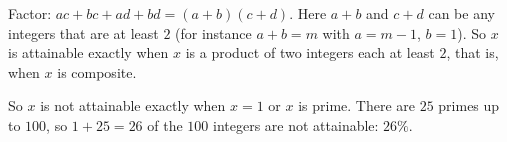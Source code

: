 Factor: $ac+bc+ad+bd=(a+b)(c+d)$. Here $a+b$ and $c+d$ can be any integers that are at least $2$ (for instance $a+b=m$ with $a=m-1$, $b=1$). So $x$ is attainable exactly when $x$ is a product of two integers each at least $2$, that is, when $x$ is composite.

So $x$ is not attainable exactly when $x=1$ or $x$ is prime. There are $25$ primes up to $100$, so $1+25=26$ of the $100$ integers are not attainable: $\boxed{26\%}$.
